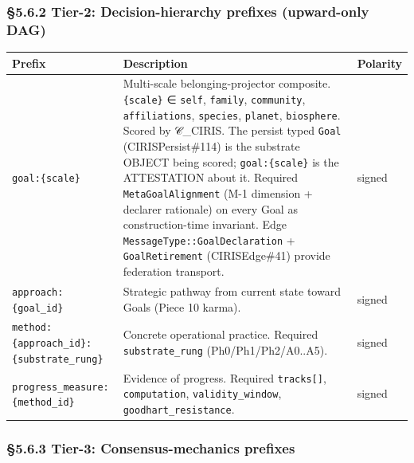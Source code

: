 \documentclass[10pt]{article}
\begin{document}
\subsubsection*{§5.6.2 Tier-2: Decision-hierarchy prefixes (upward-only DAG)}


{\footnotesize
\begin{longtable}{|p{5.33cm}|p{5.33cm}|p{5.33cm}|}\hline
\textbf{Prefix} & \textbf{Description} & \textbf{Polarity} \\ \hline\endhead
\texttt{goal:\{scale\}} & Multi-scale belonging-projector composite. \texttt{\{scale\}} ∈ \texttt{self}, \texttt{family}, \texttt{community}, \texttt{affiliations}, \texttt{species}, \texttt{planet}, \texttt{biosphere}. Scored by 𝒞\_CIRIS. The persist typed \texttt{Goal} (CIRISPersist\#114) is the substrate OBJECT being scored; \texttt{goal:\{scale\}} is the ATTESTATION about it. Required \texttt{MetaGoalAlignment} (M-1 dimension + declarer rationale) on every Goal as construction-time invariant. Edge \texttt{MessageType::GoalDeclaration} + \texttt{GoalRetirement} (CIRISEdge\#41) provide federation transport. & signed \\ \hline
\texttt{approach:\{goal\_id\}} & Strategic pathway from current state toward Goals (Piece 10 karma). & signed \\ \hline
\texttt{method:\{approach\_id\}:\{substrate\_rung\}} & Concrete operational practice. Required \texttt{substrate\_rung} (Ph0/Ph1/Ph2/A0..A5). & signed \\ \hline
\texttt{progress\_measure:\{method\_id\}} & Evidence of progress. Required \texttt{tracks[]}, \texttt{computation}, \texttt{validity\_window}, \texttt{goodhart\_resistance}. & signed \\ \hline
\end{longtable}}


\subsubsection*{§5.6.3 Tier-3: Consensus-mechanics prefixes}
\end{document}

